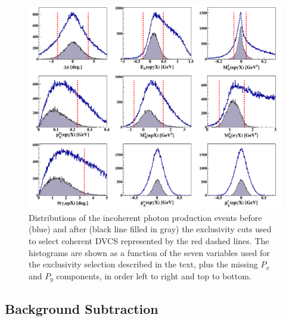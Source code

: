\documentclass[aps,prc,preprint,superscriptaddress]{revtex4}
\begin{document}
\begin{figure}[tbp!]
\center
\includegraphics[trim=10 10 10 
   5,clip,width=16.5cm]{all_incoh_exc_cuts.png}
\caption{Distributions of the incoherent photon production events before (blue) 
   and after (black line filled
	in gray) the exclusivity cuts used to select coherent DVCS represented by the 
	red dashed lines. The histograms are shown as a function of the 
	seven variables used for the exclusivity selection described in the text, 
	plus the missing $P_x$ and $P_y$ components, in order left to right and top to bottom.}
\label{fig:IncExcCuts}
\end{figure}

\subsection{Background Subtraction}
\end{document}
